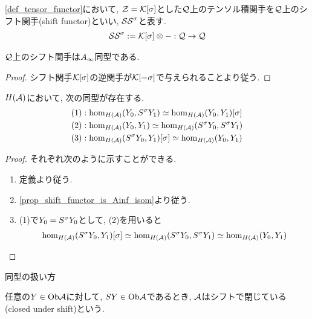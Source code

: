 \documentclass[uplatex, a4paper, 14Q, dvipdfmx]{jsarticle}
\begin{document}
\begin{definition}[$\Q$上のシフト関手]
  \cref{def_tensor_functor}において, $\mathcal{Z}=\mathcal{K}[\sigma]$とした$\Q$上のテンソル積関手を$\Q$上のシフト関手(shift functor)といい, $\mathcal{SS}^\sigma$と表す. 
  \begin{align*}
    \mathcal{SS}^\sigma := \mathcal{K}[\sigma] \otimes - : \mathcal{Q} \to \mathcal{Q}
  \end{align*}
\end{definition}

\begin{lemma} \label{prop_shift_functor_is_Ainf_isom}
  $\Q$上のシフト関手は$A_{\infty}$同型である. 
\end{lemma}

\begin{proof}
  シフト関手$\mathcal{K}[\sigma]$の逆関手が$\mathcal{K}[-\sigma]$で与えられることより従う. 
\end{proof}

\begin{lemma}
  $H(\mathcal{A})$において, 次の同型が存在する. 
  \begin{align*}
    &(1) : \hom_{H(\mathcal{A})} (Y_0,S^\sigma Y_1) \simeq \hom_{H(\mathcal{A})} (Y_0,Y_1)[\sigma] \\
    &(2) : \hom_{H(\mathcal{A})} (Y_0,Y_1) \simeq \hom_{H(\mathcal{A})} (S^\sigma Y_0,S^\sigma Y_1) \\
    &(3) : \hom_{H(\mathcal{A})} (S^\sigma Y_0,Y_1)[\sigma] \simeq \hom_{H(\mathcal{A})} (Y_0,Y_1)
  \end{align*}
\end{lemma}

\begin{proof}
  それぞれ次のように示すことができる. 
  \begin{enumerate}
    \item 定義より従う.
    \item \cref{prop_shift_functor_is_Ainf_isom}より従う.
    \item (1)で$Y_0 = S^\sigma Y_0$として, (2)を用いると
    \begin{align*}
      \hom_{H(\mathcal{A})} (S^\sigma Y_0,Y_1)[\sigma]
      \simeq \hom_{H(\mathcal{A})} (S^\sigma Y_0,S^\sigma Y_1) 
      \simeq \hom_{H(\mathcal{A})} (Y_0,Y_1)
    \end{align*}
  \end{enumerate}
\end{proof}

\begin{remark}
  同型の扱い方
\end{remark}

\begin{definition}[シフトで閉じている]
  任意の$Y \in \mathrm{Ob}\mathcal{A}$に対して, $SY \in \mathrm{Ob}\mathcal{A}$であるとき, $\mathcal{A}$はシフトで閉じている(closed under shift)という. 
\end{definition}
\end{document}
